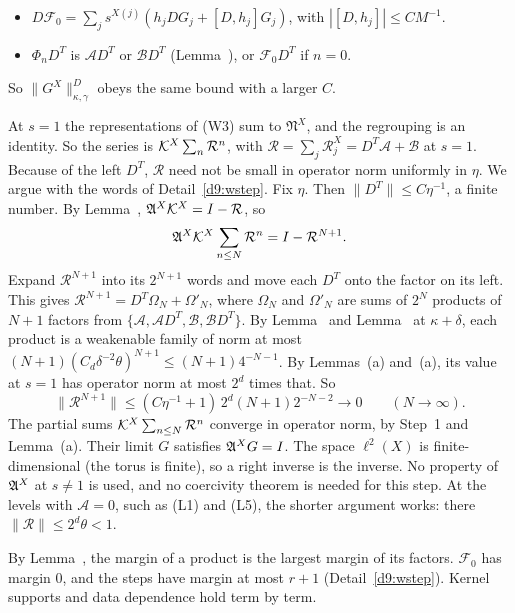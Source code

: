 \begin{detail}
\begin{step}[Derivatives]
\begin{itemize}
\item $D\mathcal F_0=\sum_js^{X(j)}(h_jDG_j+[D,h_j]G_j)$, with $|[D,h_j]|\le CM^{-1}$.
\item $\Phi_nD^T$ is $\mathcal AD^T$ or $\mathcal BD^T$ (Lemma~), or $\mathcal F_0D^T$ if $n=0$.
\end{itemize}
So $\|G^X\|^D_{\kappa,\gamma}$ obeys the same bound with a larger $C$.
\end{step}
\begin{step}[Identification at $s=1$]
At $s=1$ the representations of (W3) sum to $\mathfrak N^X$, and the regrouping is an identity. So the series is $\mathcal K^X\sum_n\mathcal R^n$, with $\mathcal R=\sum_j\mathcal R^X_j=D^T\mathcal A+\mathcal B$ at $s=1$. Because of the left $D^T$, $\mathcal R$ need not be small in operator norm uniformly in $\eta$. We argue with the words of Detail~\ref{d9:wstep}. Fix $\eta$. Then $\|D^T\|\le C\eta^{-1}$, a finite number. By Lemma~, $\mathfrak A^X\mathcal K^X=I-\mathcal R$, so
\[
\mathfrak A^X\mathcal K^X\sum_{n\le N}\mathcal R^n=I-\mathcal R^{N+1}.
\]
Expand $\mathcal R^{N+1}$ into its $2^{N+1}$ words and move each $D^T$ onto the factor on its left. This gives $\mathcal R^{N+1}=D^T\Omega_N+\Omega'_N$, where $\Omega_N$ and $\Omega'_N$ are sums of $2^N$ products of $N+1$ factors from $\{\mathcal A,\mathcal AD^T,\mathcal B,\mathcal BD^T\}$. By Lemma~ and Lemma~ at $\kappa+\delta$, each product is a weakenable family of norm at most $(N+1)(C_d\delta^{-2}\theta)^{N+1}\le(N+1)4^{-N-1}$. By Lemmas~(a) and~(a), its value at $s=1$ has operator norm at most $2^d$ times that. So
\[
\|\mathcal R^{N+1}\|\le(C\eta^{-1}+1)\,2^d(N+1)2^{-N-2}\longrightarrow0\qquad(N\to\infty).
\]
The partial sums $\mathcal K^X\sum_{n\le N}\mathcal R^n$ converge in operator norm, by Step~1 and Lemma~(a). Their limit $G$ satisfies $\mathfrak A^XG=I$. The space $\ell^2(X)$ is finite-dimensional (the torus is finite), so a right inverse is the inverse. No property of $\mathfrak A^X$ at $s\ne1$ is used, and no coercivity theorem is needed for this step. At the levels with $\mathcal A=0$, such as (L1) and (L5), the shorter argument works: there $\|\mathcal R\|\le2^d\theta<1$.
\end{step}
\begin{step}
By Lemma~, the margin of a product is the largest margin of its factors. $\mathcal F_0$ has margin $0$, and the steps have margin at most $r+1$ (Detail~\ref{d9:wstep}). Kernel supports and data dependence hold term by term.
\end{step}
\end{detail}

